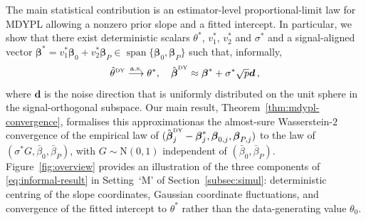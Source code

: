 \documentclass{article}
\makeatletter
\theoremstyle{definition}
\newcommand{\vnorm}[1]{%
	\ensuremath{%
		\if@display
		\left\| #1 \right\|
		\else
		\| #1 \|
		\fi
	}%
}
\newcommand*{\bb}{\boldsymbol}
\newcommand{\betady}{\ensuremath{\hat{\bbeta}^{\textrm{\tiny DY}}}}
\newcommand{\thetady}{\ensuremath{\hat{\theta}^{\textrm{\tiny DY}}}}
\def\bbeta{\bb{\beta}}
\newcommand{\vspan}{\operatorname{span}}
\makeatother
\begin{document}
\begin{bibunit}
\noindent The main statistical contribution is an estimator-level proportional-limit
law for MDYPL allowing a nonzero prior slope and a fitted
intercept. In particular, we show that there exist deterministic scalars
$\theta^*$, $v_1^*$, $v_2^*$ and $\sigma^*$ and a signal-aligned
vector
$
    \bbeta^*
    =
    v_1^*\bbeta_0+v_2^*\bbeta_P
    \in
    \vspan\{\bbeta_0,\bbeta_P\}
$
such that, informally,
\begin{equation}
\label{eq:informal-result}
    \thetady
    \overset{\mathrm{a.s.}}{\longrightarrow}
    \theta^*,
    \quad
    \betady
    \approx
    \bbeta^*+\sigma^* \sqrt{p} \bb d \,,
\end{equation}
where $\bb d$ is the noise direction that is uniformly distributed on the unit sphere in the signal-orthogonal subspace. 
Our main result, Theorem~\ref{thm:mdypl-convergence}, formalises this approximationas the almost-sure Wasserstein-$2$ convergence of the empirical law of
$(\betady_j-\bbeta_j^*,\bbeta_{0,j},\bbeta_{P,j})$ to the law of
$(\sigma^*G,\bar\beta_0,\bar\beta_P)$, with
$G\sim\mathrm N(0,1)$ independent of $(\bar\beta_0,\bar\beta_P)$.
Figure~\ref{fig:overview} provides an illustration of the three
components of \eqref{eq:informal-result} in Setting~`$\mathrm{M}$' of Section~\ref{subsec:simul}: deterministic centring of the slope
coordinates, Gaussian coordinate fluctuations, and convergence of the fitted
intercept to $\theta^*$ rather than the data-generating value $\theta_0$.


\end{bibunit}
\end{document}
